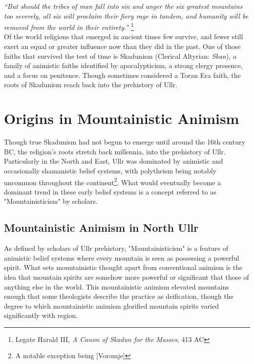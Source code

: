 \textit{``But should the tribes of man fall into sin and anger the six greatest mountains too severely, all six will proclaim their fiery rage in tandem, and humanity will be removed from the world in their entirety.''} \footnote{Legate Harald III, \textit{A Canon of Skadun for the Masses}, 413 AC}\\


Of the world religions that emerged in ancient times few survive, and fewer still exert an equal or greater influence now than they did in the past. One of those faiths that survived the test of time is Skadunism (Clerical Altyrian: \textit{Skan}), a family of animistic faiths identified by apocalypticism, a strong clergy presence, and a focus on penitence. Though sometimes considered a Toran Era faith, the roots of Skadunism reach back into the prehistory of Ullr.

\section{Origins in Mountainistic Animism}

Though true Skadunism had not begun to emerge until around the 16th century BC, the religion's roots stretch back millennia, into the prehistory of Ullr. Particularly in the North and East, Ullr was dominated by animistic and occasionally shamanistic belief systems, with polytheism being notably uncommon throughout the continent\footnote{A notable exception being [Voromje]}. What would eventually become a dominant trend in these early belief systems is a concept referred to as "Mountainisticism" by scholars.

\subsection{Mountainistic Animism in North Ullr}

As defined by scholars of Ullr prehistory, "Mountainisticism" is a feature of animistic belief systems where every mountain is seen as possessing a powerful spirit. What sets mountainistic thought apart from conventional animism is the idea that mountain spirits are somehow more powerful or significant that those of anything else in the world. This mountainistic animism elevated mountains enough that some theologists describe the practice as deification, though the degree to which mountainistic animism glorified mountain spirits varied significantly with region.\par

